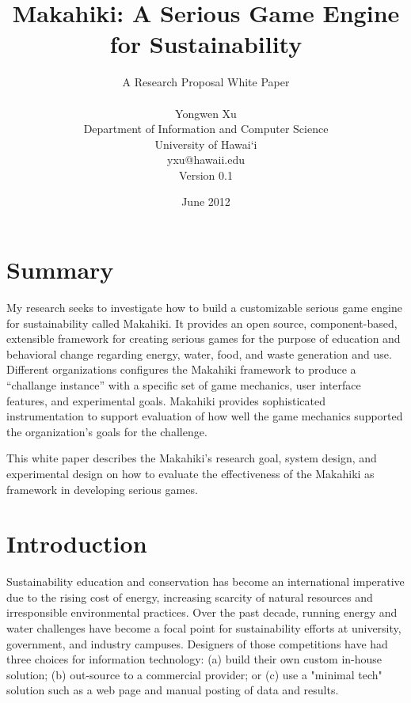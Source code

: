 \documentclass[11pt,final]{article}
\begin{document}
\title{Makahiki: A Serious Game Engine for Sustainability}
\author{A Research Proposal White Paper \\
\\
Yongwen Xu\\
Department of Information and Computer Science\\
University of Hawai`i \\
yxu@hawaii.edu\\
Version 0.1 \\
}
\date{June 2012}

\maketitle

\section{Summary}

My research seeks to investigate how to build a customizable serious game engine for sustainability called Makahiki. It provides an open source, component-based, extensible framework for creating serious games for the purpose of education and behavioral change regarding energy, water, food, and waste generation and use. Different organizations configures the Makahiki framework to produce a ``challange instance'' with a specific set of game mechanics, user interface features, and experimental goals. Makahiki provides sophisticated instrumentation to support evaluation of how well the game mechanics supported the organization's goals for the challenge.

This white paper describes the Makahiki's research goal, system design, and experimental design on how to evaluate the effectiveness of the Makahiki as framework in developing serious games.

\section{Introduction}

Sustainability education and conservation has become an international imperative due to the rising cost of energy, increasing scarcity of natural resources and irresponsible environmental practices. 
Over the past decade, running energy and water challenges have become a focal point for sustainability efforts at university, government, and industry campuses. Designers of those competitions have had three choices for information technology: (a) build their own custom in-house solution; (b) out-source to a commercial provider; or (c) use a "minimal tech" solution such as a web page and manual posting of data and results.
\end{document}
